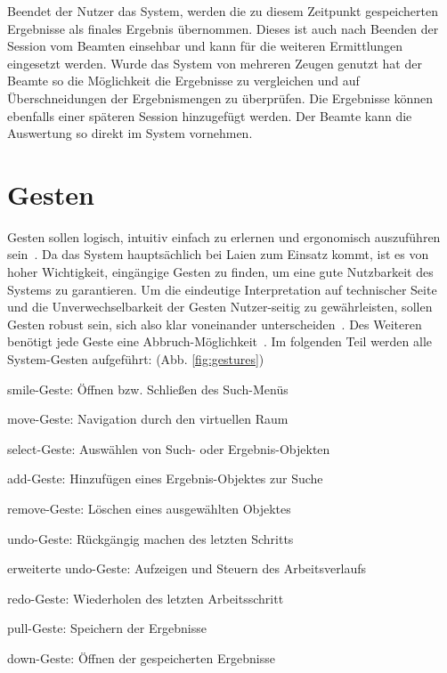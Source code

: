 \documentclass{sigchi-ext}
\begin{document}
Beendet der Nutzer das System, werden die zu diesem Zeitpunkt gespeicherten Ergebnisse als finales Ergebnis übernommen. Dieses ist auch nach Beenden der Session vom Beamten einsehbar und kann für die weiteren Ermittlungen eingesetzt werden. Wurde das System von mehreren Zeugen genutzt hat der Beamte so die Möglichkeit die Ergebnisse zu vergleichen und auf Überschneidungen der Ergebnismengen zu überprüfen. Die Ergebnisse können ebenfalls einer späteren Session hinzugefügt werden. Der Beamte kann die Auswertung so direkt im System vornehmen.

\section{Gesten}
Gesten sollen logisch, intuitiv einfach zu erlernen und ergonomisch auszuführen sein~\cite{3dinteraction:book}. 
Da das System hauptsächlich bei Laien zum Einsatz kommt, ist es von hoher Wichtigkeit, eingängige Gesten zu finden, um eine gute Nutzbarkeit des Systems zu garantieren.
Um die eindeutige Interpretation auf technischer Seite und die Unverwechselbarkeit der Gesten Nutzer-seitig zu gewährleisten, sollen Gesten robust sein, sich also klar voneinander unterscheiden~\cite{3dinteraction:book,Dorau11}.
Des Weiteren benötigt jede Geste eine Abbruch-Möglichkeit~\cite{Dorau11}. Im folgenden Teil werden alle System-Gesten aufgeführt: (Abb. \ref{fig:gestures})

smile-Geste: Öffnen bzw. Schließen des Such-Menüs

move-Geste: Navigation durch den virtuellen Raum

select-Geste: Auswählen von Such- oder Ergebnis-Objekten

add-Geste: Hinzufügen eines Ergebnis-Objektes zur Suche

remove-Geste: Löschen eines ausgewählten Objektes

undo-Geste: Rückgängig machen des letzten Schritts

erweiterte undo-Geste: Aufzeigen und Steuern des Arbeitsverlaufs 

redo-Geste: Wiederholen des letzten Arbeitsschritt

pull-Geste: Speichern der Ergebnisse

down-Geste: Öffnen der gespeicherten Ergebnisse
\end{document}
